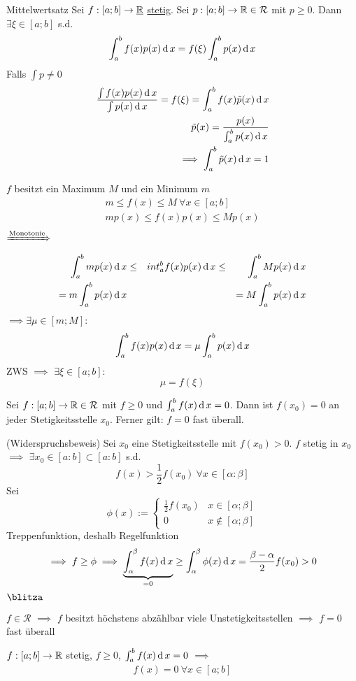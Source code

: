 \begin{Sat}{Mittelwertsatz}
  Sei $f:[a;b]\to \underline{\mathbb{R}}$ \underline{stetig}. Sei $p:[a;b]\to\mathbb{R}\in\mathcal{R}$ mit $p\geq 0$. Dann $\exists \xi\in [a;b]$ s.d.
  \[\int^b_a f(x)p(x)\operatorname{d} x=f(\xi)\int^b_a p(x)\operatorname{d} x\]
  Falls $\int p \neq 0$
  \begin{align*}
    \frac{\int f(x)p(x)\operatorname{d} x}{\int p(x)\operatorname{d} x}=f(\xi)=\int^b_a f(x)\tilde{p}(x)\operatorname{d} x\\
    \tilde{p}(x)=\frac{p(x)}{\int^b_ap(x)\operatorname{d} x}\\
    \implies \int^b_a \tilde{p}(x) \operatorname{d} x=1
  \end{align*}
\end{Sat}
\begin{Bew}
  $f$ besitzt ein Maximum $M$ und ein Minimum $m$
  \begin{align*}
    m\leq f(x) \leq M\ \forall x\in [a;b]\\
    m p(x)\leq f(x)p(x)\leq M p(x)\\
  \end{align*}
  $\xRightarrow{\text{Monotonie}}$
  \begin{align*}
    \int^b_am p(x)\operatorname{d} x &\leq& int^b_a f(x)p(x)\operatorname{d} x &\leq& \int^b_a M p(x)\operatorname{d} x\\
    = m\int^b_ap(x)\operatorname{d} x & & & &=M \int^b_a p(x)\operatorname{d} x
  \end{align*}
  $\implies \exists \mu\in [m;M]$:
  \begin{align*}
    \int^b_af(x)p(x)\operatorname{d} x = \mu \int^b_a p(x) \operatorname{d} x    
  \end{align*}
  ZWS $\implies$ $\exists \xi \in [a;b]$:
  \[\mu=f(\xi)\]
\end{Bew}
\begin{Sat}
  Sei $f:[a;b]\to \mathbb{R}\in\mathcal{R}$ mit $f\geq 0$ und $\int^b_af(x)\operatorname{d} x=0$. Dann ist $f(x_0)=0$ an jeder Stetigkeitsstelle $x_0$. Ferner gilt: $f=0$ fast überall.
\end{Sat}
\begin{Bew}{(Widerspruchsbeweis)}
  Sei $x_0$ eine Stetigkeitsstelle mit $f(x_0)>0$. $f$ stetig in $x_0$ $\implies$ $\exists x_0 \in [a:b]\subset[a:b]$ s.d.
  \[f(x)>\frac{1}{2}f(x_0)\ \forall x\in [\alpha:\beta]\]
  Sei
  \[\phi(x):=\begin{cases}
    \frac{1}{2}f(x_0)&x\in [\alpha;\beta]\\
    0 & x\not\in [\alpha;\beta]
  \end{cases}\]
  Treppenfunktion, deshalb Regelfunktion
  \[\implies f\geq \phi \implies \underbrace{\int^\beta_\alpha f(x)\operatorname{d} x}_{=0} \geq \int^\beta_\alpha\phi(x)\operatorname{d} x=\frac{\beta-\alpha}{2}f(x_0)>0\]
  $\blitza$
\end{Bew}
\begin{Sat}
  $f\in\mathcal{R}$ $\implies$ $f$ besitzt höchstens abzählbar viele Unstetigkeitsstellen $\implies$ $f=0$ fast überall
\end{Sat}
\begin{Kor}
  $f:[a;b]\to\mathbb{R}$ stetig, $f\geq 0$, $\int_a^bf(x)\operatorname{d} x=0$ $\implies$
  \begin{align*}
    f(x)=0\ \forall x\in [a;b]    
  \end{align*}
\end{Kor}
